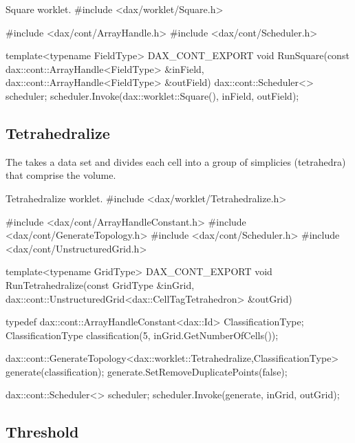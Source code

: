\begin{daxexample}{Square worklet.}
#include <dax/worklet/Square.h>

#include <dax/cont/ArrayHandle.h>
#include <dax/cont/Scheduler.h>

template<typename FieldType>
DAX_CONT_EXPORT
void RunSquare(const dax::cont::ArrayHandle<FieldType> &inField,
               dax::cont::ArrayHandle<FieldType> &outField)
{
  dax::cont::Scheduler<> scheduler;
  scheduler.Invoke(dax::worklet::Square(), inField, outField);
}
\end{daxexample}

\subsection{Tetrahedralize}

The  takes a data set and divides each cell into
a group of simplicies (tetrahedra) that comprise the volume.


\begin{daxexample}{Tetrahedralize worklet.}
#include <dax/worklet/Tetrahedralize.h>

#include <dax/cont/ArrayHandleConstant.h>
#include <dax/cont/GenerateTopology.h>
#include <dax/cont/Scheduler.h>
#include <dax/cont/UnstructuredGrid.h>

template<typename GridType>
DAX_CONT_EXPORT
void RunTetrahedralize(const GridType &inGrid,
                       dax::cont::UnstructuredGrid<dax::CellTagTetrahedron> &outGrid)
{
  typedef dax::cont::ArrayHandleConstant<dax::Id> ClassificationType;
  ClassificationType classification(5, inGrid.GetNumberOfCells());

  dax::cont::GenerateTopology<dax::worklet::Tetrahedralize,ClassificationType>
      generate(classification);
  generate.SetRemoveDuplicatePoints(false);

  dax::cont::Scheduler<> scheduler;
  scheduler.Invoke(generate, inGrid, outGrid);
}
\end{daxexample}

\subsection{Threshold}

